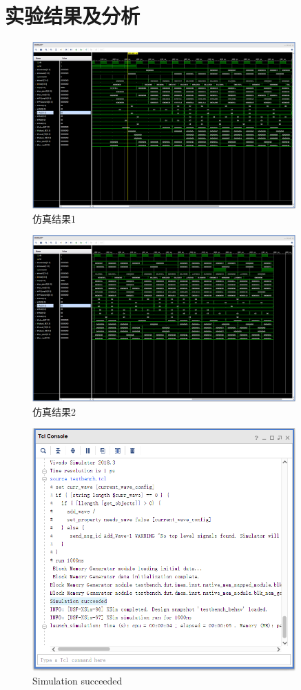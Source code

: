 \section{实验结果及分析}
\begin{figure}[H]
    \centering
    \includegraphics[width=0.9\textwidth]{image/sim1.png}
    \caption{仿真结果1}
    \label{fig:sim1}
\end{figure}
\begin{figure}[H]
    \centering
    \includegraphics[width=0.9\textwidth]{image/sim2.png}
    \caption{仿真结果2}
    \label{fig:sim2}
\end{figure}
\begin{figure}[H]
    \centering
    \includegraphics[width=0.9\textwidth]{image/tcl.png}
    \caption{Simulation succeeded}
    \label{fig:tcl}
\end{figure}
